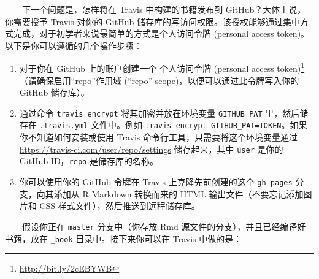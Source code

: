 \documentclass[
  12pt,
]{krantz}
\newenvironment{Shaded}{\begin{snugshade}}{\end{snugshade}}
\newcommand{\AttributeTok}[1]{\textcolor[rgb]{0.13,0.29,0.53}{#1}}
\newcommand{\BuiltInTok}[1]{#1}
\newcommand{\CommentTok}[1]{\textcolor[rgb]{0.56,0.35,0.01}{\textit{#1}}}
\newcommand{\DataTypeTok}[1]{\textcolor[rgb]{0.13,0.29,0.53}{#1}}
\newcommand{\FunctionTok}[1]{\textcolor[rgb]{0.13,0.29,0.53}{\textbf{#1}}}
\newcommand{\NormalTok}[1]{#1}
\newcommand{\PreprocessorTok}[1]{\textcolor[rgb]{0.56,0.35,0.01}{\textit{#1}}}
\newcommand{\StringTok}[1]{\textcolor[rgb]{0.31,0.60,0.02}{#1}}
\newcommand{\VariableTok}[1]{\textcolor[rgb]{0.00,0.00,0.00}{#1}}
\providecommand{\tightlist}{%
  \setlength{\itemsep}{0pt}\setlength{\parskip}{0pt}}
\renewcommand{\href}[2]{#2\footnote{\url{#1}}}
\theoremstyle{definition}
\theoremstyle{definition}
\theoremstyle{definition}
\theoremstyle{definition}
\theoremstyle{remark}
\begin{document}
  下一个问题是，怎样将在 Travis 中构建的书籍发布到 GitHub？大体上说，你需要授予 Travis 对你的 GitHub 储存库的写访问权限。该授权能够通过集中方式完成，对于初学者来说最简单的方式是个人访问令牌 (personal access token)。以下是你可以遵循的几个操作步骤：

\begin{enumerate}
\def\labelenumi{\arabic{enumi}.}
\tightlist
\item
  对于你在 GitHub 上的账户创建一个 \href{http://bit.ly/2cEBYWB}{个人访问令牌 (personal access token)}（请确保启用``repo''作用域 (``repo'' scope)，以便可以通过此令牌写入你的 GitHub 储存库）。
\item
  通过命令 \texttt{travis\ encrypt} 将其加密并放在环境变量 \texttt{GITHUB\_PAT} 里，然后储存在 \texttt{.travis.yml} 文件中。例如 \texttt{travis\ encrypt\ GITHUB\_PAT=TOKEN}。如果你不知道如何安装或使用 Travis 命令行工具，只需要将这个环境变量通过 \url{https://travis-ci.com/user/repo/settings} 储存起来，其中 \texttt{user} 是你的 GitHub ID，\texttt{repo} 是储存库的名称。
\item
  你可以使用你的 GitHub 令牌在 Travis 上克隆先前创建的这个 \texttt{gh-pages} 分支，向其添加从 R Markdown 转换而来的 HTML 输出文件（不要忘记添加图片和 CSS 样式文件），然后推送到远程储存库。
\end{enumerate}

  假设你正在 \texttt{master} 分支中（你存放 Rmd 源文件的分支），并且已经编译好书籍，放在 \texttt{\_book} 目录中。接下来你可以在 Travis 中做的是：

\begin{Shaded}
\end{Shaded}
\end{document}
